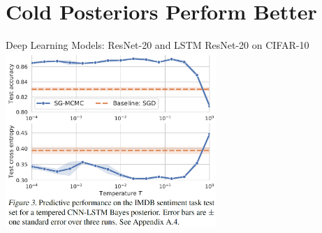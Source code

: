 \documentclass[mathserif,dvipsnames,table,xcdraw]{beamer}
\begin{document}
\section[Cold Posteriors Perform Better]{Cold Posteriors Perform Better}
\label{sec:cold_posteriors_better}

	\begin{frame}{Deep Learning Models: ResNet-20 and LSTM}
		{ResNet-20 on CIFAR-10}
		\centering
		\includegraphics[width=0.6\textwidth]{../figures/imdb_12.png}
	\end{frame}
\end{document}
